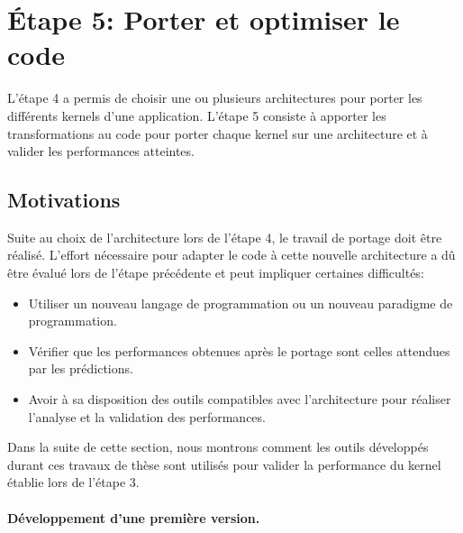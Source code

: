\section{Étape 5: Porter et optimiser le code} \label{sec:methodo_step5}

L'étape 4 a permis de choisir une ou plusieurs architectures pour porter les différents \glspl{kernel} d'une application. L'étape 5 consiste à apporter les transformations au code pour porter chaque kernel sur une architecture et à valider les performances atteintes.


\subsection{Motivations}
    
    Suite au choix de l'architecture lors de l'étape 4, le travail de portage doit être réalisé. L'effort nécessaire pour adapter le code à cette nouvelle architecture a dû être évalué lors de l'étape précédente et peut impliquer certaines difficultés:
    \begin{itemize}
        \item Utiliser un nouveau langage de programmation ou un nouveau paradigme de programmation.
    
        \item Vérifier que les performances obtenues après le portage sont celles attendues par les prédictions. 
    
        \item Avoir à sa disposition des outils compatibles avec l'architecture pour réaliser l'analyse et la validation des performances.
    \end{itemize}
    Dans la suite de cette section, nous montrons comment les outils développés durant ces travaux de thèse sont utilisés pour valider la performance du kernel établie lors de l'étape 3.


    
    \paragraph{Développement d'une première version.} 
    

